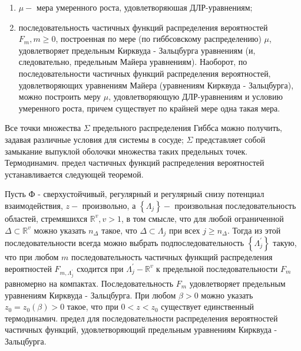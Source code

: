\documentclass[10pt]{article}
\begin{document}
\begin{enumerate}

  \item $\mu-$ мера умеренного роста, удовлетворяюшая ДЛР-уравнениям;



  \item последовательность частичных функций распределения вероятностей $F_{m}, m \geqslant 0$, построенная по мере (по гиббсовскому распределению) $\mu$, удовлетворяет предельным Кирквуда - Зальцбурга уравнениям (и, следовательно, предельным Майера уравнениям). Наоборот, по последовательности частичных функций распределения вероятностей, удовлетворяющих уравнениям Майера (уравнениям Кирквуда - Зальцбурга), можно построить меру $\mu$, удовлетворяющую ДЛР-уравнениям и условию умеренного роста, причем существует по крайней мере одна такая мера.



\end{enumerate}



Все точки множества $\Sigma$ предельного распределения Гиббса можно получить, задавая различные условия для системы в сосуде; $\Sigma$ представляет собой замыкание выпуклой оболочки множества таких предельных точек. Термодинамич. предел частичных функций распределения вероятностей устанавливается следующей теоремой.



Пусть Ф - сверхустойчивый, регулярный и регулярный снизу потенциал взаимодействия, $z-$ произвольно, а $\left\{\Lambda_{j}\right\}-$ произвольная последовательность областей, стремяшихся $\mathbb{R}^{v}, v>1$, в том смысле, что для любой ограниченной $\Delta \subset \mathbb{R}^{v}$ можно указать $n_{\Delta}$ такое, что $\Delta \subset \Lambda_{j}$ при всех $j \geqslant n_{\Delta}$. Тогда из этой последовательности всегда можно выбрать подпоследовательность $\left\{\Lambda_{j}^{\prime}\right\}$ такую, что при любом $m$ последовательность частичных функщий распределения вероятностей $F_{m, \Lambda_{j}^{\prime}}$ сходится при $\Lambda_{j}^{\prime}-\mathbb{R}^{v}$ к предельной последовательности $F_{m}$ равномерно на компактах. Последовательность $F_{m}$ удовлетворяет предельным уравнениям Кирквуда - Зальцбурга. При любом $\beta>0$ можно указать $z_{0}=z_{0}(\beta)>0$ такое, что при $0<z<z_{0}$ существует единственный термодинамич. предел для последовательности распределения вероятностей частичных функций, удовлетворяющий предельным уравнениям Кирквуда - Зальцбурга.
\end{document}
